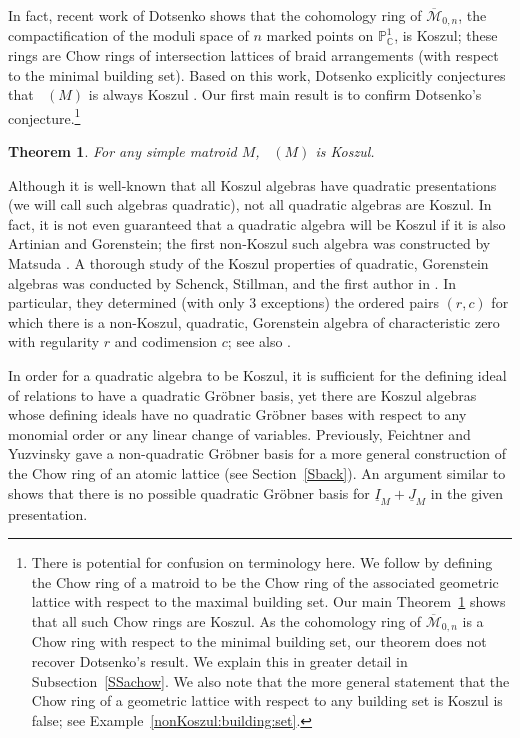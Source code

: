 \documentclass[11pt, reqno]{amsart}
\DeclareMathOperator{\Chow}{\underline{CH}}		%
\newtheorem{thm}{Theorem}[section]
\theoremstyle{definition}
\numberwithin{equation}{section}
\numberwithin{table}{section}
\begin{document}
\begin{spacing}{1.1}
In fact, recent work of Dotsenko \cite{Dot20} shows that the cohomology ring of $\mathcal{\overline{M}}_{0,n}$, the compactification of the moduli space of $n$ marked points on $\mathbb{P}_\mathbb{C}^1$, is Koszul; these rings are Chow rings of intersection lattices of braid arrangements (with respect to the minimal building set).  Based on this work, Dotsenko explicitly conjectures that $\Chow(M)$ is always Koszul  \cite[Conjecture 5.3]{Dot20}.  Our first main result is to confirm Dotsenko's conjecture.\footnote{There is potential for confusion on terminology here.  We follow \cite{AHK18} by defining the Chow ring of a matroid to be the Chow ring of the associated geometric lattice with respect to the maximal building set.  Our main Theorem~\ref{mainthm1} shows that all such Chow rings are Koszul.  As the cohomology ring of $\mathcal{\overline{M}}_{0,n}$ is a Chow ring with respect to the minimal building set, our theorem does not recover Dotsenko's result.  We explain this in greater detail in Subsection~\ref{SSachow}.  We also note that the more general statement that the Chow ring of a geometric lattice with respect to any building set is Koszul is false; see Example~\ref{nonKoszul:building:set}.  
}

\begin{thm}\label{mainthm1}
For any simple matroid $M$, $\Chow(M)$ is Koszul.
\end{thm}



Although it is well-known that all Koszul algebras have quadratic presentations (we will call such algebras quadratic),  not all quadratic algebras are Koszul.  In fact, it is not even guaranteed that a quadratic algebra will be Koszul if it is also Artinian and Gorenstein; the first non-Koszul such algebra was constructed by Matsuda \cite{Mat18}.  A thorough study of the Koszul properties of quadratic, Gorenstein algebras was conducted by Schenck, Stillman, and the first author in \cite{MSS21, MSS22}.  In particular, they determined (with only 3 exceptions) the ordered pairs $(r,c)$ for which there is a non-Koszul, quadratic, Gorenstein algebra of characteristic zero with regularity $r$ and codimension $c$; see also \cite{MS20}.  

In order for a quadratic algebra to be Koszul, it is sufficient for the defining ideal of relations to have a quadratic Gr\"obner basis, yet there are Koszul algebras whose defining ideals have no quadratic Gr\"obner bases with respect to any monomial order or any linear change of variables.  Previously, Feichtner and Yuzvinsky \cite{FY04} gave a non-quadratic Gr\"obner basis for a more general construction of the Chow ring of an atomic lattice (see Section~\ref{Sback}).  An argument similar to \cite[Proposition 3.1]{Dot20} shows that there is no possible quadratic Gr\"obner basis for $\underline{I}_M + \underline{J}_M$ in the given presentation. 


\end{spacing}
\end{document}
